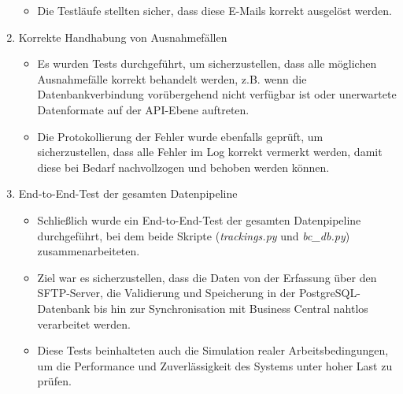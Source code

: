 \begin{enumerate}
\begin{itemize}
        \item Die Testläufe stellten sicher, dass diese E-Mails korrekt ausgelöst werden.
    \end{itemize}
    \item Korrekte Handhabung von Ausnahmefällen
    \begin{itemize}
        \item Es wurden Tests durchgeführt, um sicherzustellen, dass alle möglichen Ausnahmefälle korrekt behandelt werden, z.B. wenn die Datenbankverbindung vorübergehend nicht verfügbar ist oder unerwartete Datenformate auf der API-Ebene auftreten.
        \item Die Protokollierung der Fehler wurde ebenfalls geprüft, um sicherzustellen, dass alle Fehler im Log korrekt vermerkt werden, damit diese bei Bedarf nachvollzogen und behoben werden können.
    \end{itemize}
    \item End-to-End-Test der gesamten Datenpipeline
    \begin{itemize}
        \item Schließlich wurde ein End-to-End-Test der gesamten Datenpipeline durchgeführt, bei dem beide Skripte (\textit{trackings.py} und \textit{bc\_db.py}) zusammenarbeiteten.
        \item Ziel war es sicherzustellen, dass die Daten von der Erfassung über den SFTP-Server, die Validierung und Speicherung in der PostgreSQL-Datenbank bis hin zur Synchronisation mit Business Central nahtlos verarbeitet werden.
        \item Diese Tests beinhalteten auch die Simulation realer Arbeitsbedingungen, um die Performance und Zuverlässigkeit des Systems unter hoher Last zu prüfen.
    \end{itemize}
\end{enumerate}

\clearpage